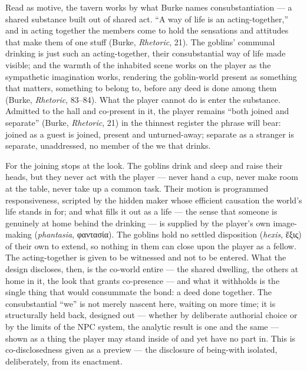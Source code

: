 \documentclass{article}
\newcommand{\gk}[1]{{\greekfont #1}}
\begin{document}
Read as motive, the tavern works by what Burke names consubstantiation — a shared substance built out of shared act. ``A way of life is an acting-together,'' and in acting together the members come to hold the sensations and attitudes that make them of one stuff (Burke, \textit{Rhetoric}, 21). The goblins' communal drinking is just such an acting-together, their consubstantial way of life made visible; and the warmth of the inhabited scene works on the player as the sympathetic imagination works, rendering the goblin-world present as something that matters, something to belong to, before any deed is done among them (Burke, \textit{Rhetoric}, 83–84). What the player cannot do is enter the substance. Admitted to the hall and co-present in it, the player remains ``both joined and separate'' (Burke, \textit{Rhetoric}, 21) in the thinnest register the phrase will bear: joined as a guest is joined, present and unturned-away; separate as a stranger is separate, unaddressed, no member of the we that drinks.

For the joining stops at the look. The goblins drink and sleep and raise their heads, but they never act with the player — never hand a cup, never make room at the table, never take up a common task. Their motion is programmed responsiveness, scripted by the hidden maker whose efficient causation the world's life stands in for; and what fills it out as a life — the sense that someone is genuinely at home behind the drinking — is supplied by the player's own image-making (\textit{phantasia}, \gk{φαντασία}). The goblins hold no settled disposition (\textit{hexis}, \gk{ἕξις}) of their own to extend, so nothing in them can close upon the player as a fellow. The acting-together is given to be witnessed and not to be entered. What the design discloses, then, is the co-world entire — the shared dwelling, the others at home in it, the look that grants co-presence — and what it withholds is the single thing that would consummate the bond: a deed done together. The consubstantial ``we'' is not merely nascent here, waiting on more time; it is structurally held back, designed out — whether by deliberate authorial choice or by the limits of the NPC system, the analytic result is one and the same — shown as a thing the player may stand inside of and yet have no part in. This is co-disclosedness given as a preview — the disclosure of being-with isolated, deliberately, from its enactment.
\end{document}

